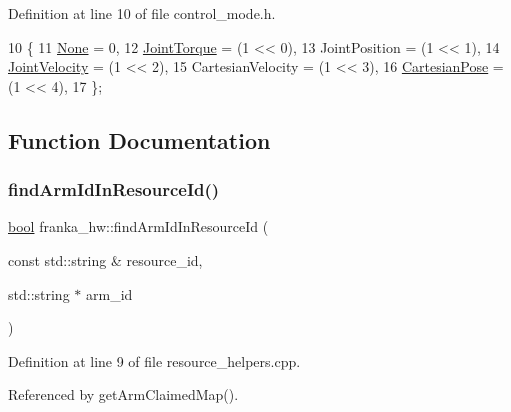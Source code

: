 Definition at line 10 of file control\+\_\+mode.\+h.


\begin{DoxyCode}
10                        \{
11   \hyperlink{namespacefranka__hw_afa416558ce4baace5ac6c71bd5d2c98ca6adf97f83acf6453d4a6a4b1070f3754}{None} = 0,
12   \hyperlink{namespacefranka__hw_afa416558ce4baace5ac6c71bd5d2c98ca6c640e0814bb12aecaa28d237d393467}{JointTorque} = (1 << 0),
13   JointPosition = (1 << 1),
14   \hyperlink{namespacefranka__hw_afa416558ce4baace5ac6c71bd5d2c98cab71066787fa2ea98f88027078359cd93}{JointVelocity} = (1 << 2),
15   CartesianVelocity = (1 << 3),
16   \hyperlink{namespacefranka__hw_afa416558ce4baace5ac6c71bd5d2c98cab5a449319cc586903a8995a0b463df50}{CartesianPose} = (1 << 4),
17 \};
\end{DoxyCode}


\subsection{Function Documentation}
\mbox{\label{namespacefranka__hw_aa86d54ddd446acb5a2101bfcc944b2c8}} 
\subsubsection{\texorpdfstring{find\+Arm\+Id\+In\+Resource\+Id()}{findArmIdInResourceId()}}
{\footnotesize\ttfamily \hyperlink{classbool}{bool} franka\+\_\+hw\+::find\+Arm\+Id\+In\+Resource\+Id (\begin{DoxyParamCaption}\item[{const std\+::string \&}]{resource\+\_\+id,  }\item[{std\+::string $\ast$}]{arm\+\_\+id }\end{DoxyParamCaption})}



Definition at line 9 of file resource\+\_\+helpers.\+cpp.



Referenced by get\+Arm\+Claimed\+Map().


